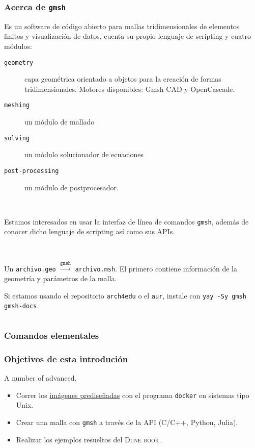 




\begin{frame}[fragile]
	\frametitle{Acerca de \texttt{gmsh}}
	Es un software de código abierto para mallas tridimensionales de elementos
	finitos y visualización de datos, cuenta su propio lenguaje de scripting y cuatro módulos:

	\begin{description}
		\item[\texttt{geometry}]

			capa geométrica orientado a objetos para la creación de formas tridimensionales. Motores disponibles: Gmsh CAD y OpenCascade.

		\item[\texttt{meshing}]

			un módulo de mallado

		\item[\texttt{solving}]

			un módulo solucionador de ecuaciones

		\item[\texttt{post-processing}]

			un módulo de postprocesador.
	\end{description}

	\

	Estamos interesados en usar la interfaz de línea de comandos
	\verb|gmsh|, además de conocer dicho lenguaje de scripting así como
	sus APIs.

	\

	Un \verb|archivo.geo| $\stackrel{\texttt{gmsh}}{\longrightarrow}$ \verb|archivo.msh|.
	El primero contiene información de la geometría y parámetros de la malla.
\end{frame}

\begin{frame}[fragile]
	Si estamos usando el repositorio \verb|arch4edu| o el \verb|aur|, instale con \verb|yay -Sy gmsh gmsh-docs|.\scriptsize

	\inputminted{bash}{arch4edu.sample}
\end{frame}

\begin{frame}[fragile]
	\frametitle{Comandos elementales}
\end{frame}

\begin{frame}
	\frametitle{Objetivos de esta introdución}
	A number of advanced.
	\begin{itemize}
		\item Correr los \href{https://github.com/orgs/cpp-review-dune/packages}{imágenes prediseñadas} con el programa \lstinline{docker} en sistemas tipo Unix.
		\item Crear una malla con \lstinline{gmsh} a través de la API (C/C++, Python, Julia).
		\item Realizar los ejemplos resueltos del \textsc{Dune book}.
	\end{itemize}
\end{frame}

